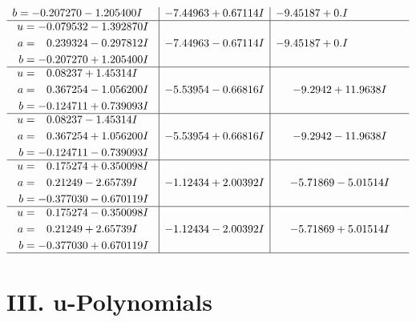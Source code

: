 \documentclass[1p]{elsarticle_modified}
\theoremstyle{definition}
\begin{document}
$$\begin{array}{c|c|c}
\begin{aligned}
b &= -0.207270 - 1.205400 I\end{aligned}
 & -7.44963 + 0.67114 I & -9.45187 + 0. I\phantom{ +0.000000I} \\ \hline\begin{aligned}
u &= -0.079532 - 1.392870 I \\
a &= \phantom{-}0.239324 - 0.297812 I \\
b &= -0.207270 + 1.205400 I\end{aligned}
 & -7.44963 - 0.67114 I & -9.45187 + 0. I\phantom{ +0.000000I} \\ \hline\begin{aligned}
u &= \phantom{-}0.08237 + 1.45314 I \\
a &= \phantom{-}0.367254 - 1.056200 I \\
b &= -0.124711 + 0.739093 I\end{aligned}
 & -5.53954 - 0.66816 I & -9.2942 + 11.9638 I \\ \hline\begin{aligned}
u &= \phantom{-}0.08237 - 1.45314 I \\
a &= \phantom{-}0.367254 + 1.056200 I \\
b &= -0.124711 - 0.739093 I\end{aligned}
 & -5.53954 + 0.66816 I & -9.2942 - 11.9638 I \\ \hline\begin{aligned}
u &= \phantom{-}0.175274 + 0.350098 I \\
a &= \phantom{-}0.21249 - 2.65739 I \\
b &= -0.377030 - 0.670119 I\end{aligned}
 & -1.12434 + 2.00392 I & -5.71869 - 5.01514 I \\ \hline\begin{aligned}
u &= \phantom{-}0.175274 - 0.350098 I \\
a &= \phantom{-}0.21249 + 2.65739 I \\
b &= -0.377030 + 0.670119 I\end{aligned}
 & -1.12434 - 2.00392 I & -5.71869 + 5.01514 I\\
 \hline 
 \end{array}$$\newpage
\newpage\renewcommand{\arraystretch}{1}
\centering \section*{ III. u-Polynomials}
\end{document}
